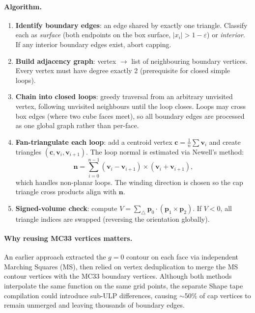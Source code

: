 \documentclass[11pt]{article}
\begin{document}
\paragraph{Algorithm.}
\begin{enumerate}[leftmargin=2em]
  \item \textbf{Identify boundary edges}: an edge shared by exactly
    one triangle.  Classify each as \emph{surface} (both endpoints on
    the box surface, $|x_i| > 1 - \varepsilon$) or \emph{interior}.
    If any interior boundary edges exist, abort capping.
  \item \textbf{Build adjacency graph}: vertex $\to$ list of
    neighbouring boundary vertices.  Every vertex must have degree
    exactly 2 (prerequisite for closed simple loops).
  \item \textbf{Chain into closed loops}: greedy traversal from an
    arbitrary unvisited vertex, following unvisited neighbours until
    the loop closes.  Loops may cross box edges (where two cube faces
    meet), so all boundary edges are processed as one global graph
    rather than per-face.
  \item \textbf{Fan-triangulate each loop}: add a centroid vertex
    $\mathbf{c} = \frac{1}{n}\sum \mathbf{v}_i$ and create triangles
    $(\mathbf{c}, \mathbf{v}_i, \mathbf{v}_{i+1})$.  The loop normal
    is estimated via Newell's method:
    \begin{equation}
      \mathbf{n} = \sum_{i=0}^{n-1} (\mathbf{v}_i - \mathbf{v}_{i+1})
                   \times (\mathbf{v}_i + \mathbf{v}_{i+1}),
    \end{equation}
    which handles non-planar loops.  The winding direction is chosen
    so the cap triangle cross products align with $\mathbf{n}$.
  \item \textbf{Signed-volume check}: compute
    $V = \sum_{\triangle} \mathbf{p}_0 \cdot (\mathbf{p}_1 \times \mathbf{p}_2)$.
    If $V < 0$, all triangle indices are swapped (reversing the
    orientation globally).
\end{enumerate}

\paragraph{Why reusing MC33 vertices matters.}
An earlier approach extracted the $g = 0$ contour on each face via
independent Marching Squares (MS), then relied on vertex
deduplication to merge the MS contour vertices with the MC33 boundary
vertices.  Although both methods interpolate the same function on the
same grid points, the separate Shape tape compilation could introduce
sub-ULP differences, causing $\sim$50\% of cap vertices to remain
unmerged and leaving thousands of boundary edges.
\end{document}
